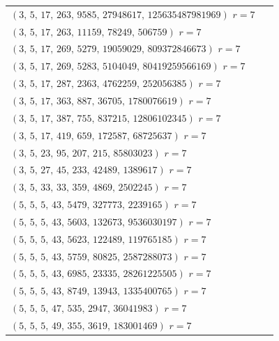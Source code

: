 \documentclass[11pt]{article}
\theoremstyle{definition}
\theoremstyle{remark}
\begin{document}
\begin{longtable}{@{}p{0.95\linewidth}@{}}
\quad $(3,\,5,\,17,\,263,\,9585,\,27948617,\,125635487981969)$ \hfill {\small $r = 7$} \\
\quad $(3,\,5,\,17,\,263,\,11159,\,78249,\,506759)$ \hfill {\small $r = 7$} \\
\quad $(3,\,5,\,17,\,269,\,5279,\,19059029,\,809372846673)$ \hfill {\small $r = 7$} \\
\quad $(3,\,5,\,17,\,269,\,5283,\,5104049,\,80419259566169)$ \hfill {\small $r = 7$} \\
\quad $(3,\,5,\,17,\,287,\,2363,\,4762259,\,252056385)$ \hfill {\small $r = 7$} \\
\quad $(3,\,5,\,17,\,363,\,887,\,36705,\,1780076619)$ \hfill {\small $r = 7$} \\
\quad $(3,\,5,\,17,\,387,\,755,\,837215,\,12806102345)$ \hfill {\small $r = 7$} \\
\quad $(3,\,5,\,17,\,419,\,659,\,172587,\,68725637)$ \hfill {\small $r = 7$} \\
\quad $(3,\,5,\,23,\,95,\,207,\,215,\,85803023)$ \hfill {\small $r = 7$} \\
\quad $(3,\,5,\,27,\,45,\,233,\,42489,\,1389617)$ \hfill {\small $r = 7$} \\
\quad $(3,\,5,\,33,\,33,\,359,\,4869,\,2502245)$ \hfill {\small $r = 7$} \\
\quad $(5,\,5,\,5,\,43,\,5479,\,327773,\,2239165)$ \hfill {\small $r = 7$} \\
\quad $(5,\,5,\,5,\,43,\,5603,\,132673,\,9536030197)$ \hfill {\small $r = 7$} \\
\quad $(5,\,5,\,5,\,43,\,5623,\,122489,\,119765185)$ \hfill {\small $r = 7$} \\
\quad $(5,\,5,\,5,\,43,\,5759,\,80825,\,2587288073)$ \hfill {\small $r = 7$} \\
\quad $(5,\,5,\,5,\,43,\,6985,\,23335,\,28261225505)$ \hfill {\small $r = 7$} \\
\quad $(5,\,5,\,5,\,43,\,8749,\,13943,\,1335400765)$ \hfill {\small $r = 7$} \\
\quad $(5,\,5,\,5,\,47,\,535,\,2947,\,36041983)$ \hfill {\small $r = 7$} \\
\quad $(5,\,5,\,5,\,49,\,355,\,3619,\,183001469)$ \hfill {\small $r = 7$} \\
\end{longtable}
\end{document}
